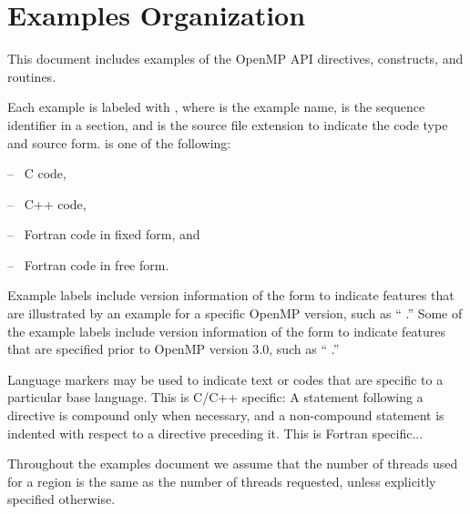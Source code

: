 \section{Examples Organization}
\label{chap:examples}
\label{sec:examples}

This document includes examples of the OpenMP API directives, constructs, and routines.

Each example is labeled with , where  is 
the example name,  is the sequence identifier in a section, and 
 is the source file extension to indicate the code type and 
source form.   is one of the following:
\begin{description}[noitemsep,labelindent=5mm,widest=f90]
\item[\plc{c}] -- \ C code,
\item[\plc{cpp}] -- \ C++ code,
\item[\plc{f}] -- \ Fortran code in fixed form, and
\item[\plc{f90}] -- \ Fortran code in free form.
\end{description}

Example labels include version information of the form
 to indicate features that are illustrated
by an example for a specific OpenMP version, such as 
`` \;.''
Some of the example labels include version information of the form
 to indicate features that are specified 
prior to OpenMP version 3.0, such as
`` \;.''

Language markers may be used to indicate text or codes that are specific 
to a particular base language.
\ccppspecificstart
This is C/C++ specific: 
A statement following a directive is compound only when necessary, and a 
non-compound statement is indented with respect to a directive preceding it.
\ccppspecificend
\fortranspecificstart
This is Fortran specific...
\fortranspecificend

Throughout the examples document we assume that the number of threads 
used for a  region is the same as 
the number of threads requested, unless explicitly specified otherwise.

